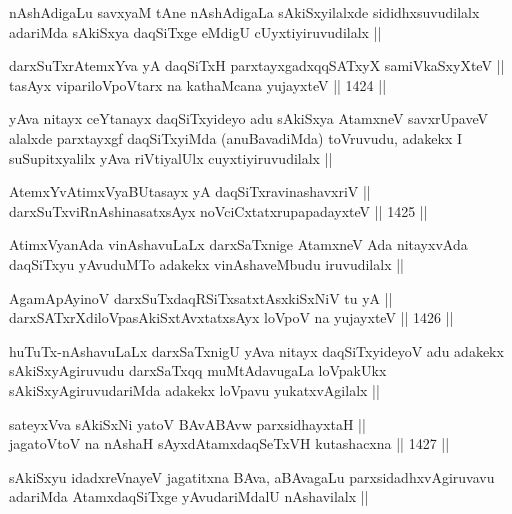 \begin{artha}
nAshAdigaLu savxyaM tAne nAshAdigaLa sAkiSxyilalxde sididhxsuvudilalx adariMda sAkiSxya daqSiTxge eMdigU cUyxtiyiruvudilalx ||
\end{artha}


\begin{shl}
darxSuTxrAtemxYva yA daqSiTxH parxtayxgadxqqSATxyX samiVkaSxyXteV ||  \\
tasAyx vipariloVpoV\s tarx na kathaMcana yujayxteV ||  1424 ||  
\end{shl}

\begin{artha}
yAva nitayx ceYtanayx daqSiTxyideyo adu sAkiSxya AtamxneV savxrUpaveV alalxde parxtayxgf daqSiTxyiMda (anuBavadiMda) toVruvudu, adakekx I suSupitxyalilx yAva riVtiyalUlx cuyxtiyiruvudilalx ||
\end{artha}

\begin{shl}
AtemxYvA\s \s timxVyaBUtasayx yA daqSiTxravinashavxriV || \\
darxSuTxviRnAshinasatxsAyx noVciCxtatxrupapadayxteV ||  1425 ||  
\end{shl}

\begin{artha}
AtimxVyanAda vinAshavuLaLx darxSaTxnige AtamxneV Ada nitayxvAda daqSiTxyu yAvuduMTo adakekx vinAshaveMbudu iruvudilalx ||
\end{artha}

\begin{shl}
AgamApAyinoV darxSuTxdaqRSiTxsatxtAsxkiSxNiV tu yA || \\
darxSATxrXdiloVpasAkiSxtAvxtatxsAyx loVpoV na yujayxteV ||  1426 ||  
\end{shl}

\begin{artha}
huTuTx-nAshavuLaLx darxSaTxnigU yAva nitayx daqSiTxyideyoV adu adakekx sAkiSxyAgiruvudu darxSaTxqq muMtAdavugaLa loVpakUkx sAkiSxyAgiruvudariMda adakekx loVpavu yukatxvAgilalx ||
\end{artha}

\begin{shl}
sateyxVva sAkiSxNi yatoV BAvABAvw parxsidhayxtaH || \\
jagatoV\s toV na nAshaH sAyxdAtamxdaqSeTxVH kutashacxna ||  1427 ||  
\end{shl}

\begin{artha}
sAkiSxyu idadxreVnayeV jagatitxna BAva, aBAvagaLu parxsidadhxvAgiruvavu adariMda AtamxdaqSiTxge yAvudariMdalU nAshavilalx ||
\end{artha}

